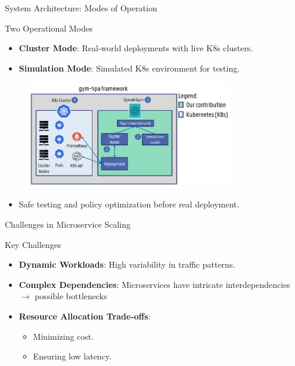 \documentclass{beamer}
\begin{document}
\begin{frame}{System Architecture: Modes of Operation}
    \begin{block}{Two Operational Modes}
        \begin{itemize}
            \item \textbf{Cluster Mode}: Real-world deployments with live K8s clusters.
            \item \textbf{Simulation Mode}: Simulated K8s environment for testing.
        \end{itemize}
    \end{block}

    \begin{figure}
        \includegraphics[width=0.8\textwidth]{images/2024_11_17_21ad14b6196e5740bf69g-4.jpg} %
    \end{figure}

    \begin{itemize}
        \item Safe testing and policy optimization before real deployment.
    \end{itemize}
\end{frame}




\begin{frame}{Challenges in Microservice Scaling}
    \begin{block}{Key Challenges}
        \begin{itemize}
            \item \textbf{Dynamic Workloads}: High variability in traffic patterns.
            \item \textbf{Complex Dependencies}: Microservices have intricate interdependencies $\rightarrow$ possible bottlenecks
            \item \textbf{Resource Allocation Trade-offs}:
            \begin{itemize}
                \item Minimizing cost.
                \item Ensuring low latency.
            \end{itemize}
        \end{itemize}
    \end{block}
\end{frame}
\end{document}
